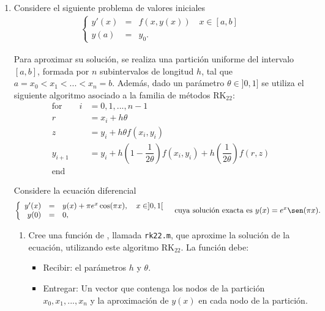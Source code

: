 \documentclass[letter,11pt]{article}
\begin{document}
\begin{enumerate}


\item Considere el siguiente problema de valores iniciales
\begin{eqnarray*}
\left \{
\begin{array}{rcl}
y'(x)&=& f(x,y(x)) \quad  x \in [a,b]\\
y(a)&=&y_0.
\end{array}
\right.
\end{eqnarray*}

Para aproximar su soluci\'on, se realiza una partici\'on uniforme del intervalo $[a,b]$, formada por $n$ subintervalos de longitud $h$, tal que $a = x_0 <x_1 < ... <x_n=b $. Adem\'as, dado un par\'ametro $\theta \in ]0,1]$ se utiliza el siguiente algoritmo asociado a la familia de m\'etodos RK$_{22}$:
\begin{align*}
\textrm{for} \quad\quad i &= 0, 1, ..., n-1\\
r &= x_i + h \theta \\
z &= y_i + h \theta f(x_i,y_i)\\
y_{i+1} &= y_i + h \left(1-\dfrac{1}{2\theta} \right) f(x_i,y_i) + h \left( \dfrac{1}{2\theta}\right) f(r,z)\\
\textrm{end} \quad \quad &
\end{align*}


Considere la ecuaci\'on diferencial 
\begin{eqnarray*}
\left \{
\begin{array}{rcl}
y'(x)&=&y(x)+ \pi e^{x}\cos(\pi x), \quad  x \in ]0,1[\\
y(0)&=&0,\\
\end{array}
\quad \textrm{cuya soluci\'on exacta es $y(x)=e^{x}\sen(\pi x)$.}\right.
\end{eqnarray*}

\begin{enumerate}
\item Cree una funci\'on de \octave, llamada \texttt{rk22.m},  que aproxime la soluci\'on  de la ecuaci\'on, utilizando este algoritmo RK$_{22}$. La funci\'on debe:
\begin{itemize}
\item Recibir: el par\'ametros  $h$ y $\theta$.
\item Entregar: Un vector que contenga los nodos de la partici\'on $x_0, x_1, ..., x_n$ y la aproximaci\'on de $y(x)$ en cada nodo de la partici\'on.
\end{itemize}





\end{enumerate}
\end{enumerate}
\end{document}
